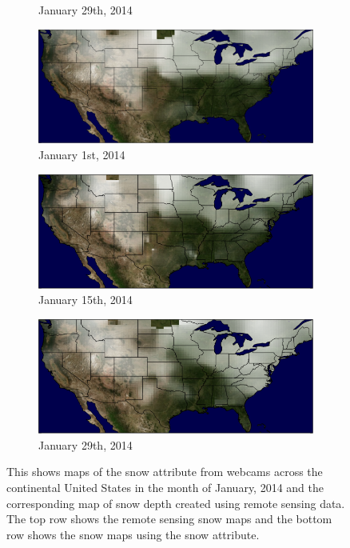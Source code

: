 \documentclass[10pt,twocolumn,letterpaper]{article}
\begin{document}
\begin{figure}
\begin{subfigure}[b]{0.33\textwidth}
    \caption{January 29th, 2014}
    \label{fig:snow_map_gt_3}
  \end{subfigure}
  \begin{subfigure}[b]{0.33\textwidth}
    \centering
		\includegraphics[width=\textwidth, trim= 0mm 0mm 0mm 0mm]{figs/snow_map_1.png}
    \caption{January 1st, 2014}
    \label{fig:snow_map_est_1}
  \end{subfigure}
  \begin{subfigure}[b]{0.33\textwidth}
    \centering
		\includegraphics[width=\textwidth, trim= 0mm 0mm 0mm 0mm]{figs/snow_map_2.png}
    \caption{January 15th, 2014}
    \label{fig:snow_map_est_2}
  \end{subfigure}
  \begin{subfigure}[b]{0.33\textwidth}
    \centering
		\includegraphics[width=\textwidth, trim= 0mm 0mm 0mm 0mm]{figs/snow_map_3.png}
    \caption{January 29th, 2014}
    \label{fig:snow_map_est_3}
  \end{subfigure}
  \caption{This shows maps of the snow attribute from webcams across the
           continental United States in the month of January, 2014 and the corresponding
           map of snow depth created using remote sensing data.\protect\footnotemark 
           The top row shows the remote sensing snow maps and the bottom row 
           shows the snow maps using the snow attribute.}
  \label{fig:snow_maps}
\end{figure}
\end{document}
